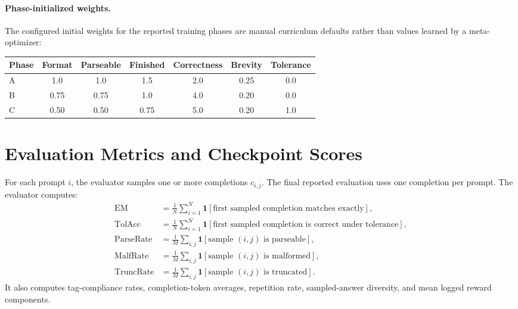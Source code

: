 \documentclass{article} %
\begin{document}
\paragraph{Phase-initialized weights.}
The configured initial weights for the reported training phases are manual curriculum defaults rather than values learned by a meta-optimizer:
\begin{center}
\small
\begin{tabular}{lcccccc}
\toprule
Phase & Format & Parseable & Finished & Correctness & Brevity & Tolerance \\
\midrule
A & 1.0 & 1.0 & 1.5 & 2.0 & 0.25 & 0.0 \\
B & 0.75 & 0.75 & 1.0 & 4.0 & 0.20 & 0.0 \\
C & 0.50 & 0.50 & 0.75 & 5.0 & 0.20 & 1.0 \\
\bottomrule
\end{tabular}
\end{center}

\section{Evaluation Metrics and Checkpoint Scores}

For each prompt $i$, the evaluator samples one or more completions $c_{i,j}$. The final reported evaluation uses one completion per prompt. The evaluator computes:
\begin{align}
\mathrm{EM} &= \frac{1}{N}\sum_{i=1}^N \mathbf{1}[\text{first sampled completion matches exactly}],\\
\mathrm{TolAcc} &= \frac{1}{N}\sum_{i=1}^N \mathbf{1}[\text{first sampled completion is correct under tolerance}],\\
\mathrm{ParseRate} &= \frac{1}{M}\sum_{i,j}\mathbf{1}[\text{sample } (i,j) \text{ is parseable}],\\
\mathrm{MalfRate} &= \frac{1}{M}\sum_{i,j}\mathbf{1}[\text{sample } (i,j) \text{ is malformed}],\\
\mathrm{TruncRate} &= \frac{1}{M}\sum_{i,j}\mathbf{1}[\text{sample } (i,j) \text{ is truncated}].
\end{align}
It also computes tag-compliance rates, completion-token averages, repetition rate, sampled-answer diversity, and mean logged reward components.
\end{document}
